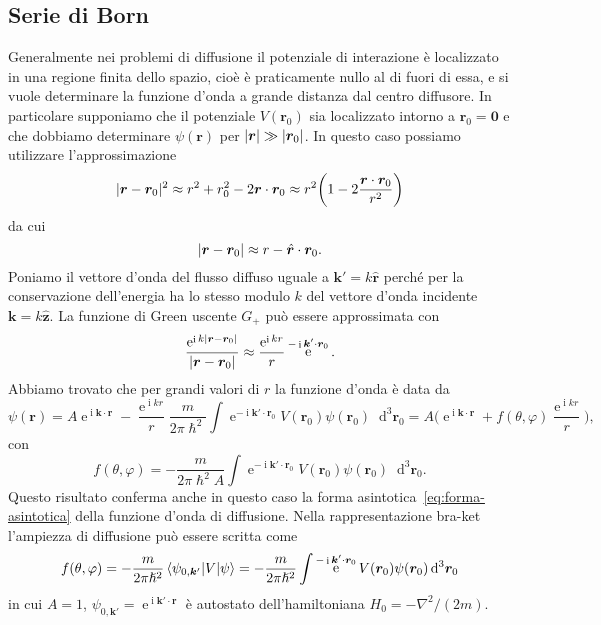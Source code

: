 \documentclass[a4paper,fleqn,twoside,12pt]{article}
\renewcommand{\phi}{\varphi}
\newcommand*{\dd}{\mathop{}\!\mathrm{d}} %
\DeclareMathOperator{\e}{\mathrm{e}} %
\DeclareMathOperator{\uimm}{\mathrm{i}} %
\DeclarePairedDelimiter{\abs}{\lvert}{\rvert}
\newcommand*{\versor}[1]{\hat{\bm{#1}}}
\begin{document}
\subsection{Serie di Born}
\label{sec:serie-born}

Generalmente nei problemi di diffusione il potenziale di interazione è
localizzato in una regione finita dello spazio, cioè è praticamente nullo al di
fuori di essa, e si vuole determinare la funzione d'onda a grande distanza dal
centro diffusore.  In particolare supponiamo che il potenziale $V(\bm{r}_{0})$
sia localizzato intorno a $\bm{r}_{0} = \bm{0}$ e che dobbiamo determinare
$\psi(\bm{r})$ per $\abs{\bm{r}} \gg \abs{\bm{r}_{0}}$.  In questo caso possiamo
utilizzare l'approssimazione
\begin{equation}
  \abs{\bm{r} - \bm{r}_{0}}^{2} \approx r^{2} +r_{0}^{2} -
  2\bm{r}\cdot\bm{r}_{0} \approx r^{2}\bigg(1 -
  2\frac{\bm{r}\cdot\bm{r}_{0}}{r^{2}}\bigg)
\end{equation}
da cui
\begin{equation}
  \abs{\bm{r} - \bm{r}_{0}} \approx r - \versor{r}\cdot\bm{r}_{0}.
\end{equation}
Poniamo il vettore d'onda del flusso diffuso uguale a $\bm{k}' = k\versor{r}$
perché per la conservazione dell'energia ha lo stesso modulo $k$ del vettore
d'onda incidente $\bm{k} = k\versor{z}$.  La funzione di Green uscente $G_{+}$
può essere approssimata con
\begin{equation}
  \frac{\e^{\uimm k\abs{\bm{r} - \bm{r}_{0}}}}{\abs{\bm{r} - \bm{r}_{0}}}
  \approx \frac{\e^{\uimm kr}}{r} \e^{-\uimm \bm{k}'\cdot\bm{r}_{0}}.
\end{equation}
Abbiamo trovato che per grandi valori di $r$ la funzione d'onda è data da
\begin{equation}
  \label{eq:bar}
  \psi(\bm{r}) = A\e^{\uimm \bm{k}\cdot\bm{r}} - \frac{\e^{\uimm kr}}{r}
  \frac{m}{2\pi\hslash^{2}} \int \e^{-\uimm \bm{k}'\cdot\bm{r}_{0}}
  V(\bm{r}_{0}) \psi(\bm{r}_{0}) \dd^{3}\bm{r}_{0} = A\bigg(\e^{\uimm
    \bm{k}\cdot\bm{r}} + f(\theta,\phi)\frac{\e^{\uimm kr}}{r}\bigg),
\end{equation}
con
\begin{equation}
  f(\theta,\phi) = -\frac{m}{2\pi\hslash^{2}A} \int\e^{-\uimm
    \bm{k}'\cdot\bm{r}_{0}} V(\bm{r}_{0}) \psi(\bm{r}_{0}) \dd^{3}\bm{r}_{0}.
\end{equation}
Questo risultato conferma anche in questo caso la forma
asintotica~\eqref{eq:forma-asintotica} della funzione d'onda di diffusione.
Nella rappresentazione bra-ket l'ampiezza di diffusione può essere scritta come
\begin{equation}
  f(\theta,\phi) = -\frac{m}{2\pi\hslash^{2}} \braket{\psi_{0,\bm{k}'} | V |
    \psi} = -\frac{m}{2\pi\hslash^{2}} \int\e^{-\uimm
    \bm{k}'\cdot\bm{r}_{0}} V(\bm{r}_{0}) \psi(\bm{r}_{0}) \dd^{3}\bm{r}_{0}
\end{equation}
in cui $A=1$, $\psi_{0,\bm{k'}} = \e^{\uimm \bm{k}'\cdot\bm{r}}$ è autostato
dell'hamiltoniana $H_{0} = -\nabla^{2}/(2m)$.
\end{document}
